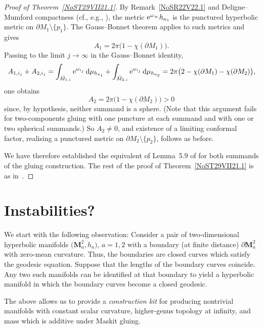 \documentclass[pdftex]{sigma}
\numberwithin{equation}{section}
\newcommand{\twodimN}{\purple{\mathbf{M}^2}}
\newcommand{\zMone}{\red{{\hat M}_{1,i}}}
\newcommand{\zMtwo}{\red{{\hat M}_{2,i}}}
\newcommand{\purple}[1]{{\color{purple}#1}}
\newcommand{\red}[1]{{\color{red}#1}}
\newcommand{\mv}{\omega}%
\renewcommand{\red}[1]{#1}
\renewcommand{\purple}[1]{#1}
\begin{document}
\begin{proof}[Proof of Theorem~\ref{NoST29VII21.1}]
By Remark~\ref{NoSR22V22.1} and Deligne--Mumford compactness (cf., e.g., \cite[Proposition~A.2, Appendix~A.1]{RupflinToppingZhu}), the metric ${\rm e}^{\omega_\infty}h_{\kappa_1}$ is the punctured hyperbolic metric on $\partial M_1\setminus \{p_1\}$.
The Gauss--Bonnet theorem applies to such metrics and gives
\begin{equation*}%
 A_1 = \red{2\pi}
 \big(
 1-\chi(\partial M_1)
 \big).
\end{equation*}
Passing to the limit $j\to\infty$ in the Gauss--Bonnet identity,
\begin{equation*}%
 A_{1,i_j } + A_{2,i_j }
 =\int_{\zMone } {\rm e}^{\mv_{i_j} }\, {\rm d}\mu_{h_{\kappa_1}} +
 \int_{\zMtwo } {\rm e}^{\mv_{i_j}}\, {\rm d}\mu_{h_{\kappa_2}}
 = \red{2\pi}
 \big(
 2-\chi(\partial M_1) - \chi(\partial M_2)
 \big),
\end{equation*}
one obtains
\begin{equation*}%
 A_2 = \red{2\pi}
 \big(
 1-\chi(\partial M_2)
 \big)
 {>0}
\end{equation*}
{since, by hypothesis, neither summand is a sphere. (Note that this argument fails for two-components gluing with one puncture at each summand and with one or two spherical summands.)}
So $A_2\ne 0$, and existence of a limiting conformal factor, realising a punctured metric on $\partial M_2\setminus \{p_2\}$, follows as before.

We have therefore established the equivalent of Lemma~5.9 of \cite{CDW} for both summands of the gluing construction.
The rest of the proof of Theorem~\ref{NoST29VII21.1}
is as in~\cite{CDW}.
\end{proof}

\section{Instabilities?} \label{s11VI22.1}

We start with the following observation:
Consider a pair of two-dimensional hyperbolic manifolds $\big(\twodimN _a,h_a\big)$, $a=1,2$ with a boundary (at finite distance) $\partial \twodimN _a$ with zero-mean curvature. Thus, the boundaries are closed curves which satisfy the geodesic equation. Suppose that the lengths of the boundary curves coincide.
Any two such manifolds can be identified at that boundary to yield a hyperbolic manifold in which the boundary curves become a closed geodesic.

The above allows us to provide a \emph{construction kit} for producing nontrivial manifolds with constant scalar curvature, higher-genus topology at infinity, and mass which is additive under Maskit gluing.
\end{document}
